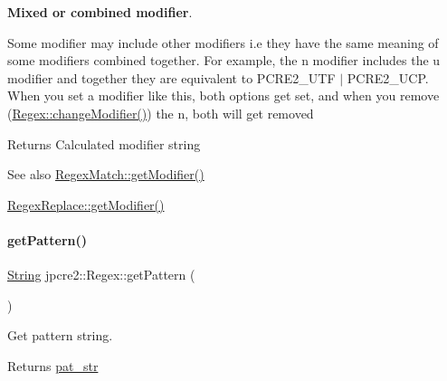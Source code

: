 {\bfseries Mixed or combined modifier}.

Some modifier may include other modifiers i.\+e they have the same meaning of some modifiers combined together. For example, the \textquotesingle{}n\textquotesingle{} modifier includes the \textquotesingle{}u\textquotesingle{} modifier and together they are equivalent to {\ttfamily P\+C\+R\+E2\+\_\+\+U\+TF $\vert$ P\+C\+R\+E2\+\_\+\+U\+CP}. When you set a modifier like this, both options get set, and when you remove ({\ttfamily \hyperlink{classjpcre2_1_1Regex_a9ab3efed9819a51225456e6d8487de56_a9ab3efed9819a51225456e6d8487de56}{Regex\+::change\+Modifier()})} the \textquotesingle{}n\textquotesingle{}, both will get removed \begin{DoxyReturn}{Returns}
Calculated modifier string 
\end{DoxyReturn}
\begin{DoxySeeAlso}{See also}
\hyperlink{classjpcre2_1_1RegexMatch_a909abcce3c02b07cfcd1173a9d0be9ba_a909abcce3c02b07cfcd1173a9d0be9ba}{Regex\+Match\+::get\+Modifier()} 

\hyperlink{classjpcre2_1_1RegexReplace_a4c325837716be3a48e2f92a80790d49f_a4c325837716be3a48e2f92a80790d49f}{Regex\+Replace\+::get\+Modifier()} 
\end{DoxySeeAlso}
\hypertarget{classjpcre2_1_1Regex_a006dd17f71a2d717aa9575d72fac6d7b_a006dd17f71a2d717aa9575d72fac6d7b}{}\label{classjpcre2_1_1Regex_a006dd17f71a2d717aa9575d72fac6d7b_a006dd17f71a2d717aa9575d72fac6d7b} 
\paragraph{\texorpdfstring{get\+Pattern()}{getPattern()}}
{\footnotesize\ttfamily \hyperlink{namespacejpcre2_a91f03070152fb228bc116c5a737f1d16}{String} jpcre2\+::\+Regex\+::get\+Pattern (\begin{DoxyParamCaption}{ }\end{DoxyParamCaption})\hspace{0.3cm}{\ttfamily [inline]}}



Get pattern string. 

\begin{DoxyReturn}{Returns}
\hyperlink{classjpcre2_1_1Regex_a0bceb85b6dbba355b56b5cc312214435}{pat\+\_\+str} 
\end{DoxyReturn}
\hypertarget{classjpcre2_1_1Regex_a857307fc59ba7f010b097e61c1744923_a857307fc59ba7f010b097e61c1744923}{}\label{classjpcre2_1_1Regex_a857307fc59ba7f010b097e61c1744923_a857307fc59ba7f010b097e61c1744923} 

